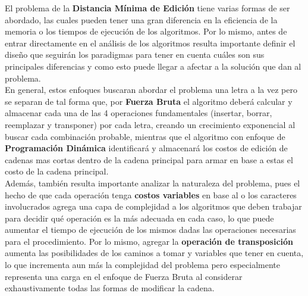 El problema de la \textbf{Distancia Mínima de Edición} tiene varias formas de ser abordado, las cuales pueden tener una gran diferencia en la eficiencia de la memoria o los tiempos de ejecución de los algoritmos. Por lo mismo, antes de entrar directamente en el análisis de los algoritmos resulta importante definir el diseño que seguirán los paradigmas para tener en cuenta cuáles son sus principales diferencias y como esto puede llegar a afectar a la solución que dan al problema.\\

En general, estos enfoques buscaran abordar el problema una letra a la vez pero se separan de tal forma que, por \textbf{Fuerza Bruta} el algoritmo deberá calcular y almacenar cada una de las 4 operaciones fundamentales (insertar, borrar, reemplazar y transponer) por cada letra, creando un crecimiento exponencial al buscar cada combinación probable, mientras que el algoritmo con enfoque de \textbf{Programación Dinámica} identificará y almacenará los costos de edición de cadenas mas cortas dentro de la cadena principal para armar en base a estas el costo de la cadena principal.\\

Además, también resulta importante analizar la naturaleza del problema, pues el hecho de que cada operación tenga \textbf{costos variables} en base al o los caracteres involucrados agrega una capa de complejidad a los algoritmos que deben trabajar para decidir qué operación es la más adecuada en cada caso, lo que puede aumentar el tiempo de ejecución de los mismos dadas las operaciones necesarias para el procedimiento. Por lo mismo, agregar la \textbf{operación de transposición} aumenta las posibilidades de los caminos a tomar y variables que tener en cuenta, lo que incrementa aun más la complejidad del problema pero especialmente representa una carga en el enfoque de Fuerza Bruta al considerar exhaustivamente todas las formas de modificar la cadena.\\
\newpage
